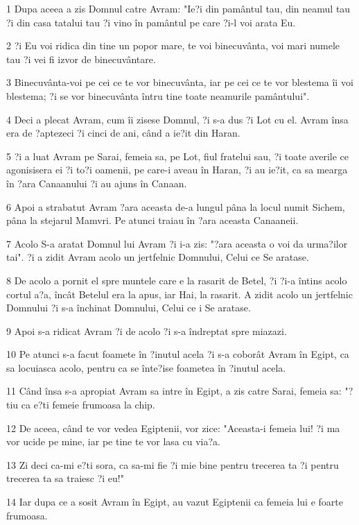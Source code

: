 \par 1 Dupa aceea a zis Domnul catre Avram: "Ie?i din pamântul tau, din neamul tau ?i din casa tatalui tau ?i vino în pamântul pe care ?i-l voi arata Eu.
\par 2 ?i Eu voi ridica din tine un popor mare, te voi binecuvânta, voi mari numele tau ?i vei fi izvor de binecuvântare.
\par 3 Binecuvânta-voi pe cei ce te vor binecuvânta, iar pe cei ce te vor blestema îi voi blestema; ?i se vor binecuvânta întru tine toate neamurile pamântului".
\par 4 Deci a plecat Avram, cum îi zisese Domnul, ?i s-a dus ?i Lot cu el. Avram însa era de ?aptezeci ?i cinci de ani, când a ie?it din Haran.
\par 5 ?i a luat Avram pe Sarai, femeia sa, pe Lot, fiul fratelui sau, ?i toate averile ce agonisisera ei ?i to?i oamenii, pe care-i aveau în Haran, ?i au ie?it, ca sa mearga în ?ara Canaanului ?i au ajuns în Canaan.
\par 6 Apoi a strabatut Avram ?ara aceasta de-a lungul pâna la locul numit Sichem, pâna la stejarul Mamvri. Pe atunci traiau în ?ara aceasta Canaaneii.
\par 7 Acolo S-a aratat Domnul lui Avram ?i i-a zis: "?ara aceasta o voi da urma?ilor tai". ?i a zidit Avram acolo un jertfelnic Domnului, Celui ce Se aratase.
\par 8 De acolo a pornit el spre muntele care e la rasarit de Betel, ?i ?i-a întins acolo cortul a?a, încât Betelul era la apus, iar Hai, la rasarit. A zidit acolo un jertfelnic Domnului ?i s-a închinat Domnului, Celui ce i Se aratase.
\par 9 Apoi s-a ridicat Avram ?i de acolo ?i s-a îndreptat spre miazazi.
\par 10 Pe atunci s-a facut foamete în ?inutul acela ?i s-a coborât Avram în Egipt, ca sa locuiasca acolo, pentru ca se înte?ise foametea în ?inutul acela.
\par 11 Când însa s-a apropiat Avram sa intre în Egipt, a zis catre Sarai, femeia sa: "?tiu ca e?ti femeie frumoasa la chip.
\par 12 De aceea, când te vor vedea Egiptenii, vor zice: "Aceasta-i femeia lui! ?i ma vor ucide pe mine, iar pe tine te vor lasa cu via?a.
\par 13 Zi deci ca-mi e?ti sora, ca sa-mi fie ?i mie bine pentru trecerea ta ?i pentru trecerea ta sa traiesc ?i eu!"
\par 14 Iar dupa ce a sosit Avram în Egipt, au vazut Egiptenii ca femeia lui e foarte frumoasa.
